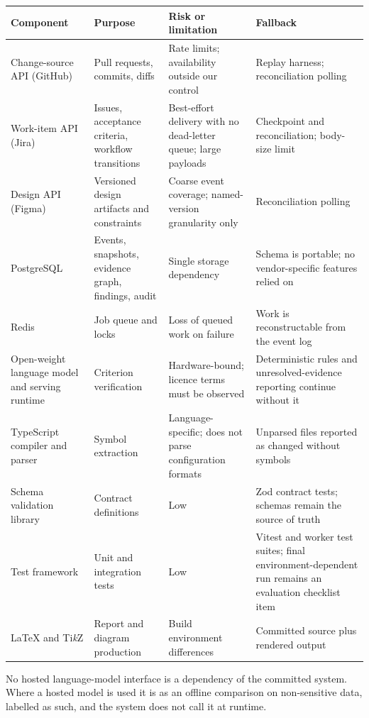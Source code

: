 \begin{longtable}{>{\raggedright\arraybackslash}p{}>{\raggedright\arraybackslash}p{}>{\raggedright\arraybackslash}p{}>{\raggedright\arraybackslash}p{}}
\toprule
Component & Purpose & Risk or limitation & Fallback \\
\midrule
\endhead
Change-source API (GitHub) & Pull requests, commits, diffs & Rate limits;
  availability outside our control & Replay harness; reconciliation polling \\
Work-item API (Jira) & Issues, acceptance criteria, workflow transitions &
  Best-effort delivery with no dead-letter queue; large payloads & Checkpoint
  and reconciliation; body-size limit \\
Design API (Figma) & Versioned design artifacts and constraints & Coarse event
  coverage; named-version granularity only & Reconciliation polling \\
PostgreSQL & Events, snapshots, evidence graph, findings, audit & Single
  storage dependency & Schema is portable; no vendor-specific features relied
  on \\
Redis & Job queue and locks & Loss of queued work on failure & Work is
  reconstructable from the event log \\
Open-weight language model and serving runtime & Criterion verification &
  Hardware-bound; licence terms must be observed & Deterministic rules and
  unresolved-evidence reporting continue without it \\
TypeScript compiler and parser & Symbol extraction & Language-specific; does
  not parse configuration formats & Unparsed files reported as changed without
  symbols \\
Schema validation library & Contract definitions & Low & Zod contract tests;
  schemas remain the source of truth \\
Test framework & Unit and integration tests & Low & Vitest and worker test
  suites; final environment-dependent run remains an evaluation checklist item \\
\LaTeX{} and Ti\emph{k}Z & Report and diagram production & Build environment
  differences & Committed source plus rendered output \\
\bottomrule
\end{longtable}

\noindent No hosted language-model interface is a dependency of the committed
system. Where a hosted model is used it is as an offline comparison on
non-sensitive data, labelled as such, and the system does not call it at
runtime.

